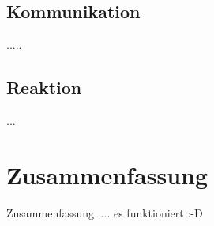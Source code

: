 \documentclass[
	11pt,								%
	a4paper,						%
	oneside,						%
	titlepage,					%
	headsepline,				%
	DIV13,							%
	abstracton,	 				%
	BCOR0cm,						%
	bibliography=totoc, %
]{scrreprt}							%
\begin{document}
\section{Kommunikation}
.....\\
\section{Reaktion}
...\




\chapter{Zusammenfassung}
\label{cha:Zusammenfassung}
Zusammenfassung .... es funktioniert :-D


 
  
 {}
 

%
\end{document}
